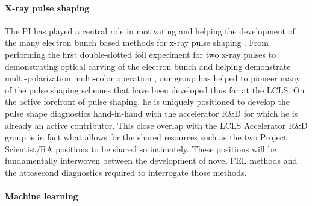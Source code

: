 

\paragraph*{X-ray pulse shaping}
The PI has played a central role in motivating and helping the development of the many electron bunch based methods for x-ray pulse shaping \cite{Lutman13_twocolor,Marinelli13_twocolor,Helml2014,Marinelli2015,Lutman2016,Marinelli2016}.
From performing the first double-slotted foil experiment for two x-ray pulses \cite{CoffeeDAMOP11} to demonstrating optical carving of the electron bunch \cite{Marinelli2016} and helping demonstrate multi-polarization multi-color operation \cite{Lutman2016}, our group has helped to pioneer many of the pulse shaping schemes that have been developed thus far at the LCLS.
On the active forefront of pulse shaping, he is uniquely positioned to develop the pulse shape diagnostics hand-in-hand with the accelerator R\&D for which he is already an active contributor.
This close overlap with the LCLS Accelerator R\&D group is in fact what allows for the shared resources such as the two Project Scientist/RA positions to be shared so intimately.
These positions will be fundamentally interwoven between the development of novel FEL methods and the attosecond diagnostics required to interrogate those methods.


\paragraph*{Machine learning}


